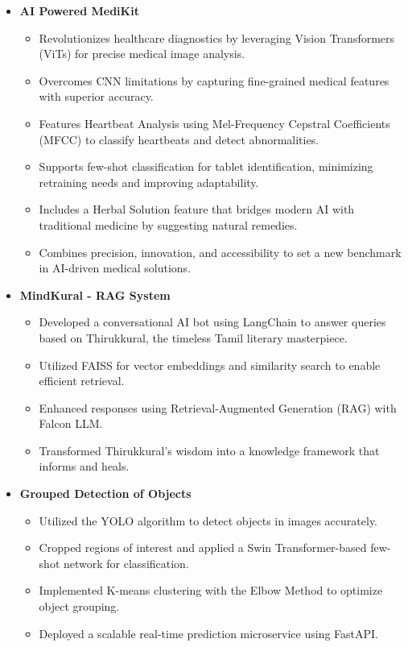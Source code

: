 \documentclass[letterpaper,11pt]{article}
\newcommand{\resitem}[1]{\item #1 \vspace{-2pt}}
\newcommand{\resheading}[1]{\textbf{\sffamily{\mbox{~}{\large #1} \vphantom{p\^{E}}}}}
\begin{document}
\resheading{Projects}
\begin{itemize}

\item[]
	\textbf{AI Powered MediKit}
	\vspace{-3mm}
	\begin{itemize}
		\resitem{Revolutionizes healthcare diagnostics by leveraging Vision Transformers (ViTs) for precise medical image analysis.}
		\resitem{Overcomes CNN limitations by capturing fine-grained medical features with superior accuracy.}
		\resitem{Features Heartbeat Analysis using Mel-Frequency Cepstral Coefficients (MFCC) to classify heartbeats and detect abnormalities.}
		\resitem{Supports few-shot classification for tablet identification, minimizing retraining needs and improving adaptability.}
		\resitem{Includes a Herbal Solution feature that bridges modern AI with traditional medicine by suggesting natural remedies.}
		\resitem{Combines precision, innovation, and accessibility to set a new benchmark in AI-driven medical solutions.}
	\end{itemize}

\item[]
	\textbf{MindKural - RAG System}
	\vspace{-3mm}
	\begin{itemize}
		\resitem{Developed a conversational AI bot using LangChain to answer queries based on Thirukkural, the timeless Tamil literary masterpiece.}
		\resitem{Utilized FAISS for vector embeddings and similarity search to enable efficient retrieval.}
		\resitem{Enhanced responses using Retrieval-Augmented Generation (RAG) with Falcon LLM.}
		\resitem{Transformed Thirukkural’s wisdom into a knowledge framework that informs and heals.}
	\end{itemize}

\item[]
	\textbf{Grouped Detection of Objects}
	\vspace{-3mm}
	\begin{itemize}
		\resitem{Utilized the YOLO algorithm to detect objects in images accurately.}
		\resitem{Cropped regions of interest and applied a Swin Transformer-based few-shot network for classification.}
		\resitem{Implemented K-means clustering with the Elbow Method to optimize object grouping.}
		\resitem{Deployed a scalable real-time prediction microservice using FastAPI.}
	\end{itemize}


\end{itemize}
\end{document}
